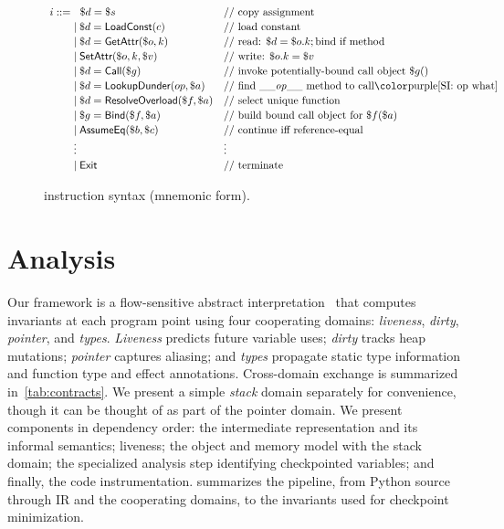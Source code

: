 
\begin{figure}[t]
\centering
\[
\renewcommand{\arraystretch}{1.15}
\begin{array}{l@{}ll}
i ::= \;&\hspace{6pt} \$d = \$s & \text{// copy assignment} \\
      &\mid \$d = \tLoadConst(c) & \text{// load constant} \\
      &\mid \$d = \tGetAttr(\$o, k) & \text{// read: } \$d = \$o.k; \text{bind if method} \\
      &\mid \tSetAttr(\$o, k, \$v) & \text{// write: } \$o.k = \$v \\
      &\mid \$d = \mathsf{Call}(\$g) & \text{// invoke potentially-bound call object } \$g() \\
      &\mid \$d = \tLookupDunder(op, \$a)  & \text{// find \_\_\textit{op}\_\_ method to call\si{op what}} \\
      &\mid \$d = \tResolveOverload(\$f, \$a) & \text{// select unique function} \\
      &\mid \$g = \tBind(\$f, \$a) & \text{// build bound call object for } \$f(\$a) \\
      &\mid \tAssumeEq(\$b, \$c) & \text{// continue iff reference-equal} \\
      & \vdots & \vdots \\
      &\mid \tExit & \text{// terminate}
\end{array}
\]
\caption{\spytecode instruction syntax (mnemonic form).}
\label{fig:tac-syntax-reduced}
\end{figure}

\section{Analysis}
\label{sec:analysis}

Our framework is a flow-sensitive abstract interpretation~\cite{cousot1977abstract} that computes invariants at each program point using four cooperating domains: \emph{liveness}, \emph{dirty}, \emph{pointer}, and \emph{types}. \emph{Liveness} predicts future variable uses; \emph{dirty} tracks heap mutations; \emph{pointer} captures aliasing; and \emph{types} propagate static type information and function type and effect annotations. Cross-domain exchange is summarized in~\cref{tab:contracts}. We present a simple \emph{stack} domain separately for convenience, though it can be thought of as part of the pointer domain. We present components in dependency order: the intermediate representation and its informal semantics; liveness; the object and memory model with the stack domain; the specialized analysis step identifying checkpointed variables; and finally, the code instrumentation.  summarizes the pipeline, from Python source through IR and the cooperating domains, to the invariants used for checkpoint minimization.

